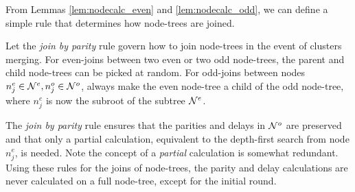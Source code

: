 %
%
%

From Lemmas \ref{lem:nodecalc_even} and \ref{lem:nodecalc_odd}, we can define a simple rule that determines how node-trees are joined.

\begin{definition}\label{def:joinbyparity}
  Let the \emph{join by parity} rule govern how to join node-trees in the event of clusters merging. For even-joins between two even or two odd node-trees, the parent and child node-trees can be picked at random. For odd-joins between nodes $n_j^e \in \mathcal{N}^e, n_j^o \in \mathcal{N}^o$, always make the even node-tree a child of the odd node-tree, where $n_j^e$ is now the subroot of the subtree $\mathcal{N}^e$.
\end{definition}
The \emph{join by parity} rule ensures that the parities and delays in $\mathcal{N}^o$ are preserved and that only a partial calculation, equivalent to the depth-first search from node $n_j^e$, is needed. Note the concept of a \emph{partial} calculation is somewhat redundant. Using these rules for the joins of node-trees, the parity and delay calculations are never calculated on a full node-tree, except for the initial round. 

